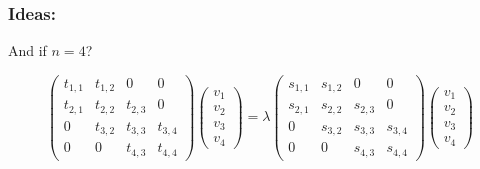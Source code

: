 \documentclass{beamer}
\theoremstyle{definition} \newtheorem{de}{Def}
\theoremstyle{remark} \newtheorem{os}[de]{Oss}
\theoremstyle{plain} \newtheorem{te}[de]{Teo}
\theoremstyle{plain} \newtheorem{co}[de]{Cor}
\theoremstyle{plain} \newtheorem{pr}[de]{Prop}
\theoremstyle{plain} \newtheorem{lem}[de]{Lemm}
\theoremstyle{remark} \newtheorem{rem}[de]{Remark}
\begin{document}
\begin{frame}
  \frametitle{Ideas:}

  And if $n=4$?
  
  \begin{equation*}
    \begin{pmatrix}
      t_{1,1} & t_{1,2} & 0 & 0\\
      t_{2,1} & t_{2,2} & t_{2,3} & 0\\
      0 & t_{3,2} & t_{3,3} & t_{3,4}\\
      0 & 0 & t_{4,3} & t_{4,4}
    \end{pmatrix} \begin{pmatrix} 
      v_1 \\ 
      v_2 \\
      v_3 \\
      v_4
    \end{pmatrix} = \lambda \begin{pmatrix}
      s_{1,1} & s_{1,2} & 0 & 0\\
      s_{2,1} & s_{2,2} & s_{2,3} & 0\\
      0 & s_{3,2} & s_{3,3} & s_{3,4}\\
      0 & 0 & s_{4,3} & s_{4,4}
    \end{pmatrix} \begin{pmatrix}
      v_1 \\ 
      v_2 \\
      v_3 \\
      v_4
    \end{pmatrix}
  \end{equation*}

\end{frame}
\end{document}
